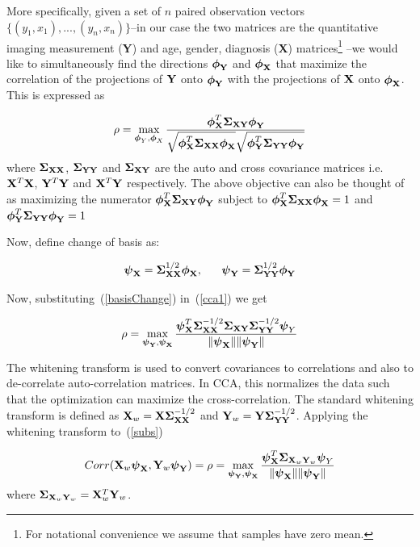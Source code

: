 \documentclass{llncs}
\newcommand{\X}{{\bf X}}
\newcommand{\Y}{{\bf Y}}
\newcommand{\bs}{\boldsymbol}
\begin{document}
More specifically, given a set of $n$ paired observation vectors
$\{(y_1,x_1),...,(y_n,x_n)\}$--in our case the two matrices are the
quantitative imaging measurement ({\Y}) and age, gender, diagnosis ({\X}) matrices\footnote{For
  notational convenience we assume that samples have zero mean.} --we would like to simultaneously find the directions
${\bs{\bs\phi_{\Y}}}$ and
${\bs{\bs\phi_{\X}}}$ that maximize the correlation of
the projections of ${\Y}$ onto ${\bs{\bs\phi_{\Y}}}$
with the projections of ${\X}$ onto
${\bs{\bs\phi_{\X}}}$. This is expressed as

\begin{equation}
\label{cca1}
\rho=\max_{{\bs\phi_Y}, {\bs\phi_X}}
\frac{{\bs\phi_{\X}^T\bs\Sigma_{\X\Y}}\bs\phi_{\Y}}{\sqrt{\bs\phi_{\X}^T\bs\Sigma_{\X\X}\bs\phi_{\X}}\sqrt{\bs\phi_{\Y}^T\bs\Sigma_{\Y\Y}\bs\phi_{\Y}}}
\end{equation}
where ${\bs\Sigma_{\X\X}}$, ${\bs\Sigma_{\Y\Y}}$ and ${\bs\Sigma_{\X\Y}}$ are the auto and cross covariance matrices i.e. $\X^T\X$, $\Y^T\Y$ and $\X^T\Y$ respectively. The above objective can also be thought of as maximizing the numerator $\bs\phi_{\X}^T\bs\Sigma_{\X\Y}\bs\phi_{\Y}$ subject to $\bs\phi_{\X}^T\bs\Sigma_{\X\X}\bs\phi_{\X} =1$ and $\bs\phi_{\Y}^T\bs\Sigma_{\Y\Y}\bs\phi_{\Y}=1$

Now, define change of basis as:

\begin{equation}
\label{basisChange}
\bs\psi_{\X} = \bs\Sigma_{\X\X}^{1/2}\bs\phi_{\X}, \;\;\;\;\;\;   \bs\psi_{\Y} = \bs\Sigma_{\Y\Y}^{1/2}\bs\phi_{\Y} 
\end{equation}

Now, substituting~(\ref{basisChange}) in~(\ref{cca1}) we get 

\begin{equation}
\label{subs}
\rho= \max_{{\bs\psi_{\Y}}, {\bs\psi_{\X}}} \frac{\bs\psi_{\X}^T \bs\Sigma_{\X\X}^{-1/2}\bs\Sigma_{\X\Y}\bs\Sigma_{\Y\Y}^{-1/2}\bs\psi_Y}{\|\bs\psi_{\X}\| \|\bs\psi_{\Y}\|}
\end{equation}

The whitening transform is used to convert covariances to correlations
and also to de-correlate auto-correlation matrices.  In CCA, this
normalizes the data such that the optimization can maximize the
cross-correlation.  The standard whitening transform is defined as
$\X_w= \X\bs\Sigma_{\X\X}^{-1/2}$ and $\Y_w=
\Y\bs\Sigma_{\Y\Y}^{-1/2}$.  Applying the whitening transform
to~(\ref{subs})

\begin{equation}
\label{simplifiedcca}
Corr(\X_w\bs\psi_{\X},\Y_w\bs\psi_{\Y})=\rho=\max_{{\bs\psi_{\Y}}, {\bs\psi_{\X}}} \frac{\bs\psi_{\X}^T \bs\Sigma_{\X_w\Y_w}\bs\psi_Y}{\|\bs\psi_{\X}\| \|\bs\psi_{\Y}\|}
\end{equation}
where $\bs\Sigma_{\X_w\Y_w} = \X_w^T\Y_w$. 
\end{document}
